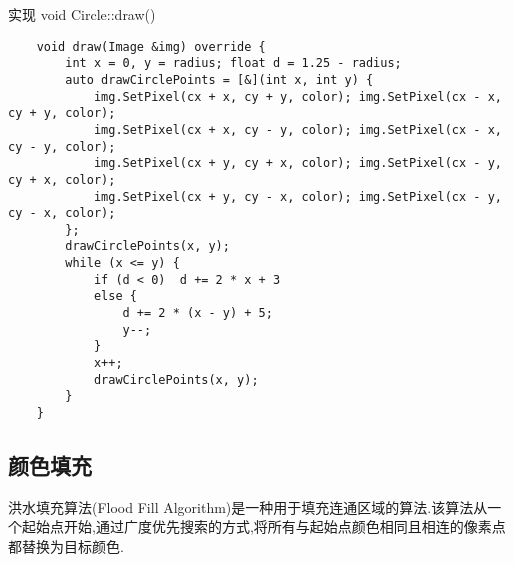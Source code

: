 \documentclass[a4paper,twoside]{article}
\begin{document}
\begin{listing}[H]
    \caption{实现 void Circle::draw()}
    \label{code:circle_draw}
    \begin{verbatim}
    void draw(Image &img) override {
        int x = 0, y = radius; float d = 1.25 - radius;
        auto drawCirclePoints = [&](int x, int y) {
            img.SetPixel(cx + x, cy + y, color); img.SetPixel(cx - x, cy + y, color);
            img.SetPixel(cx + x, cy - y, color); img.SetPixel(cx - x, cy - y, color);
            img.SetPixel(cx + y, cy + x, color); img.SetPixel(cx - y, cy + x, color);
            img.SetPixel(cx + y, cy - x, color); img.SetPixel(cx - y, cy - x, color);
        };
        drawCirclePoints(x, y);
        while (x <= y) {
            if (d < 0)  d += 2 * x + 3
            else { 
                d += 2 * (x - y) + 5;
                y--;
            }
            x++;
            drawCirclePoints(x, y);
        }
    }
    \end{verbatim}
\end{listing}
\subsection{颜色填充}
洪水填充算法(Flood Fill Algorithm)是一种用于填充连通区域的算法.该算法从一个起始点开始,通过广度优先搜索的方式,将所有与起始点颜色相同且相连的像素点都替换为目标颜色.
\end{document}
